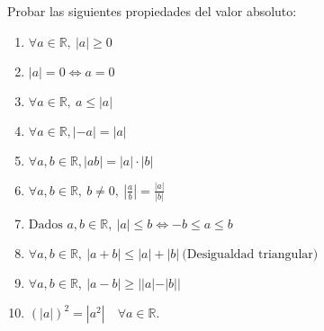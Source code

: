 


\begin{ejercicio}
    Probar las siguientes propiedades del valor absoluto:
    \begin{enumerate}
        \item $\forall a \in \mathbb{R}, ~|a| \geq 0$

        \item $|a| = 0 \Longleftrightarrow a = 0$

        \item $\forall a \in \mathbb{R}, ~a \leq |a|$

        \item $\forall a \in \mathbb{R}, |-a| = |a|$

        \item $\forall a,b \in \mathbb{R}, |ab| = |a| \cdot |b|$

        \item $\forall a,b \in \mathbb{R},~b \neq 0,~|\frac{a}{b}| =\frac{|a|}{|b|}$

        \item $\text{Dados $a,b \in \mathbb{R}$}, ~|a| \leq b \Longleftrightarrow -b \leq a \leq b$

        \item $\forall a,b \in \mathbb{R},~|a+b| \leq |a| + |b| ~\text{(Desigualdad triangular)}$

        \item $\forall a,b \in \mathbb{R},~|a-b| \geq ||a| - |b||$

        \item $(|a|)^{2} = |a^{2}| \quad \forall a \in \mathbb{R}$.


    \end{enumerate}
\end{ejercicio}